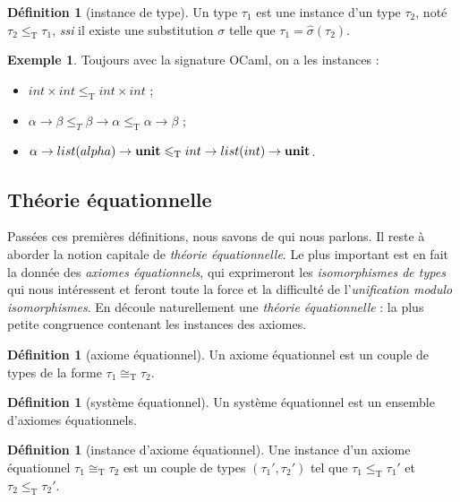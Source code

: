 \documentclass[a4paper]{report}
\theoremstyle{definition}
\newtheorem{definition}[theoreme]{Définition}
\newtheorem{exemple}[theoreme]{Exemple}
\newcommand{\ssi}{\textit{ssi}\xspace}
\newcommand{\unit}{\bold{unit}}
\newcommand{\T}{\mathrm{T}}
\begin{document}
\begin{definition}[instance de type]
	Un type $\tau_1$ est une instance d'un type $\tau_2$, noté $\tau_2 \leqslant_\T \tau_1$, \ssi il existe une substitution $\sigma$ telle que $\tau_1 = \hat\sigma (\tau_2)$.
\end{definition}

\begin{exemple}
	Toujours avec la signature OCaml, on a les instances :
	\begin{itemize}
		\item $int \times int \leqslant_\T int \times int$ ;
		\item $\alpha \rightarrow \beta \leqslant_T \beta \rightarrow \alpha \leqslant_\T \alpha \rightarrow \beta$ ;
		\item $\alpha \rightarrow list (alpha) \rightarrow \unit \leqslant_\T int \rightarrow list (int) \rightarrow \unit$.
	\end{itemize}
\end{exemple}


\subsection{Théorie équationnelle}

Passées ces premières définitions, nous savons de qui nous parlons. Il reste à aborder la notion capitale de \emph{théorie équationnelle}. Le plus important est en fait la donnée des \emph{axiomes équationnels}, qui exprimeront les \emph{isomorphismes de types} qui nous intéressent et feront toute la force et la difficulté de l'\emph{unification modulo isomorphismes}. En découle naturellement une \emph{théorie équationnelle} : la plus petite congruence contenant les instances des axiomes.

\begin{definition}[axiome équationnel]
	Un axiome équationnel est un couple de types de la forme $\tau_1 \cong_\T \tau_2$.
\end{definition}

\begin{definition}[système équationnel]
	Un système équationnel est un ensemble d'axiomes équationnels.
\end{definition}

\begin{definition}[instance d'axiome équationnel]
	Une instance d'un axiome équationnel $\tau_1 \cong_\T \tau_2$ est un couple de types $(\tau_1', \tau_2')$ tel que $\tau_1 \leqslant_\T \tau_1'$ et $\tau_2 \leqslant_\T \tau_2'$.
\end{definition}
\end{document}

